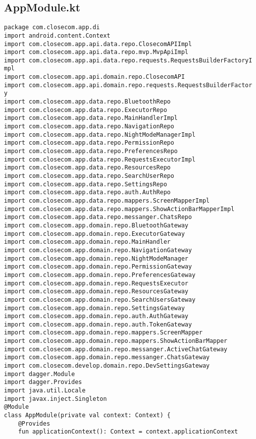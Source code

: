\documentclass[listing]{espd}
\begin{document}
\subsection{AppModule.kt}
\begin{verbatim}
package com.closecom.app.di
import android.content.Context
import com.closecom.app.api.data.repo.ClosecomAPIImpl
import com.closecom.app.api.data.repo.mvp.MvpApiImpl
import com.closecom.app.api.data.repo.requests.RequestsBuilderFactoryI
mpl
import com.closecom.app.api.domain.repo.ClosecomAPI
import com.closecom.app.api.domain.repo.requests.RequestsBuilderFactor
y
import com.closecom.app.data.repo.BluetoothRepo
import com.closecom.app.data.repo.ExecutorRepo
import com.closecom.app.data.repo.MainHandlerImpl
import com.closecom.app.data.repo.NavigationRepo
import com.closecom.app.data.repo.NightModeManagerImpl
import com.closecom.app.data.repo.PermissionRepo
import com.closecom.app.data.repo.PreferencesRepo
import com.closecom.app.data.repo.RequestsExecutorImpl
import com.closecom.app.data.repo.ResourcesRepo
import com.closecom.app.data.repo.SearchUserRepo
import com.closecom.app.data.repo.SettingsRepo
import com.closecom.app.data.repo.auth.AuthRepo
import com.closecom.app.data.repo.mappers.ScreenMapperImpl
import com.closecom.app.data.repo.mappers.ShowActionBarMapperImpl
import com.closecom.app.data.repo.messanger.ChatsRepo
import com.closecom.app.domain.repo.BluetoothGateway
import com.closecom.app.domain.repo.ExecutorGateway
import com.closecom.app.domain.repo.MainHandler
import com.closecom.app.domain.repo.NavigationGateway
import com.closecom.app.domain.repo.NightModeManager
import com.closecom.app.domain.repo.PermissionGateway
import com.closecom.app.domain.repo.PreferencesGateway
import com.closecom.app.domain.repo.RequestsExecutor
import com.closecom.app.domain.repo.ResourcesGateway
import com.closecom.app.domain.repo.SearchUsersGateway
import com.closecom.app.domain.repo.SettingsGateway
import com.closecom.app.domain.repo.auth.AuthGateway
import com.closecom.app.domain.repo.auth.TokenGateway
import com.closecom.app.domain.repo.mappers.ScreenMapper
import com.closecom.app.domain.repo.mappers.ShowActionBarMapper
import com.closecom.app.domain.repo.messanger.ActiveChatGateway
import com.closecom.app.domain.repo.messanger.ChatsGateway
import com.closecom.develop.domain.repo.DevSettingsGateway
import dagger.Module
import dagger.Provides
import java.util.Locale
import javax.inject.Singleton
@Module
class AppModule(private val context: Context) {
    @Provides
    fun applicationContext(): Context = context.applicationContext

\end{verbatim}
\end{document}

